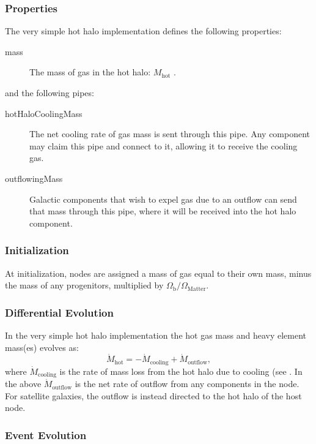 \subsubsection{Properties}

The very simple hot halo implementation defines the following properties:
\begin{description}
 \item [{\normalfont \ttfamily mass}] The mass of gas in the hot halo: $M_\mathrm{hot}$ {\normalfont \ttfamily [hotHaloMass]}.
\end{description}
and the following pipes:
\begin{description}
 \item [{\normalfont \ttfamily hotHaloCoolingMass}] The net cooling rate of gas mass is sent through this pipe. Any \gls{component} may claim this pipe and connect to it, allowing it to receive the cooling gas.
 \item [{\normalfont \ttfamily outflowingMass}] Galactic components that wish to expel gas due to an outflow can send that mass  through this pipe, where it will be received into the hot halo component. 
\end{description}

\subsubsection{Initialization}

At initialization, nodes are assigned a mass of gas equal to their own mass, minus the mass of any progenitors, multiplied by $\Omega_\mathrm{b}/\Omega_\mathrm{Matter}$.

\subsubsection{Differential Evolution}

In the very simple hot halo implementation the hot gas mass and heavy element mass(es) evolves as:
\begin{equation}
 \dot{M}_\mathrm{hot} = - \dot{M}_\mathrm{cooling} + \dot{M}_\mathrm{outflow},
\end{equation}
where $\dot{M}_\mathrm{cooling}$ is the rate of mass loss from the hot halo due to cooling (see .
In the above $\dot{M}_\mathrm{outflow}$ is the net rate of outflow from any components in the node. For satellite galaxies, the outflow is instead directed to the hot halo of the host \gls{node}.

\subsubsection{Event Evolution}

